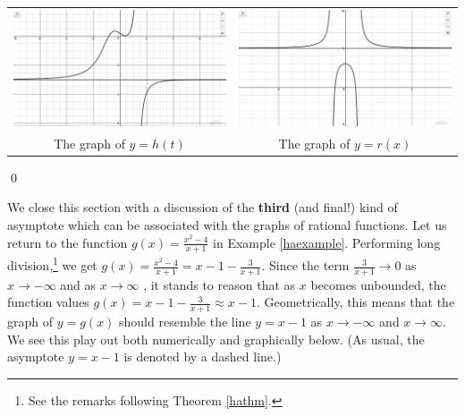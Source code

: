 \begin{ex}
\begin{enumerate}
\begin{center}
\begin{tabular}{cc}
\includegraphics[width=3in]{./IntroRationalGraphics/HAEx03.jpg}  & \includegraphics[width=3in]{./IntroRationalGraphics/HAEx04.jpg} \\
The graph of $y=h(t)$  & The graph of $y=r(x)$ \\


\end{tabular}
\end{center} 

\end{enumerate}

\qed

\end{ex}


We close this section with a discussion of the \textbf{third} (and final!) kind of asymptote which can be associated with the graphs of rational functions. Let us return to the function $g(x) = \frac{x^2-4}{x+1}$ in Example \ref{haexample}. Performing long division,\footnote{See the remarks following Theorem \ref{hathm}.} we get $g(x) = \frac{x^2-4}{x+1} = x-1 - \frac{3}{x+1}$.  Since the term $\frac{3}{x+1} \rightarrow 0$ as $x \rightarrow - \infty$ and as $x \rightarrow  \infty$ , it stands to reason that as $x$ becomes unbounded, the function values   $g(x) = x-1 - \frac{3}{x+1} \approx x-1$.  Geometrically, this means that the graph of $y=g(x)$ should resemble the line $y = x-1$ as $x \rightarrow  -\infty$ and $x \rightarrow \infty$.  We see this play out both numerically and graphically below. (As usual, the asymptote $y = x-1$ is denoted by a dashed line.)

